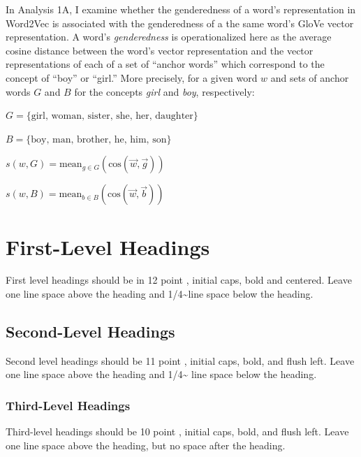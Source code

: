 \documentclass[10pt, letterpaper]{article}
\begin{document}
In Analysis 1A, I examine whether the genderedness of a word's
representation in Word2Vec is associated with the genderedness of a the
same word's GloVe vector representation. A word's \emph{genderedness} is
operationalized here as the average cosine distance between the word's
vector representation and the vector representations of each of a set of
``anchor words'' which correspond to the concept of ``boy'' or ``girl.''
More precisely, for a given word \(w\) and sets of anchor words \(G\)
and \(B\) for the concepts \emph{girl} and \emph{boy}, respectively:

\vspace{5 mm}

\(G = \{{\text{girl, woman, sister, she, her, daughter}}\}\)

\(B = \{{\text{boy, man, brother, he, him, son}}\}\)

\(s(w, G) = \text{mean}_{g \in G}(\text{cos}(\vec{w}, \vec{g}))\)

\(s(w, B) = \text{mean}_{b \in B}(\text{cos}(\vec{w}, \vec{b}))\)

\hypertarget{first-level-headings}{%
\section{First-Level Headings}\label{first-level-headings}}

First level headings should be in 12 point , initial caps, bold and
centered. Leave one line space above the heading and
1/4\textasciitilde line space below the heading.

\hypertarget{second-level-headings}{%
\subsection{Second-Level Headings}\label{second-level-headings}}

Second level headings should be 11 point , initial caps, bold, and flush
left. Leave one line space above the heading and 1/4\textasciitilde{}
line space below the heading.

\hypertarget{third-level-headings}{%
\subsubsection{Third-Level Headings}\label{third-level-headings}}

Third-level headings should be 10 point , initial caps, bold, and flush
left. Leave one line space above the heading, but no space after the
heading.
\end{document}
